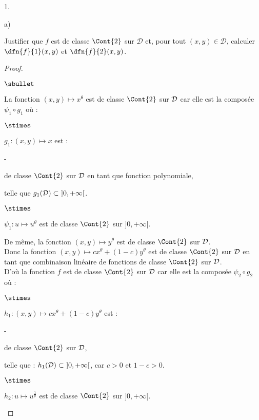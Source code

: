 \begin{noliste}{1.}
\begin{noliste}{a)}
  
  \item Justifier que $f$ est de classe $\Cont{2}$ sur $\mathcal{D}$ 
  et, pour tout $(x,y) \in \mathcal{D}$, calculer $\dfn{f}{1}(x,y)$ et 
  $\dfn{f}{2}(x,y)$.
  
  \begin{proof}~
   \begin{noliste}{$\sbullet$}
    \item La fonction $(x,y) \mapsto x^\theta$ est de classe $\Cont{2}$
    sur ${\cal D}$ car elle est la composée $\psi_1 \circ g_1$ où :
    \begin{noliste}{$\stimes$}
      \item $g_1 : (x,y) \mapsto x$ est :
    \end{noliste}
      \begin{liste}{-}
	\item de classe $\Cont{2}$ sur 
        ${\cal D}$ en tant que fonction polynomiale,
	\item telle que $g_1({\cal D}) \subset \ ]0,+\infty[$.
      \end{liste}
    \begin{noliste}{$\stimes$}
      \item $\psi_1 : u \mapsto u^\theta$ est de classe $\Cont{2}$ sur 
      $]0,+\infty[$.
    \end{noliste}
    De même, la fonction $(x,y) \mapsto y^\theta$ est de classe 
    $\Cont{2}$ sur ${\cal D}$.\\
    Donc la fonction $(x,y) \mapsto c x^\theta + (1-c) y^\theta$
    est de classe $\Cont{2}$ sur ${\cal D}$ en tant que 
    combinaison linéaire de fonctions de classe $\Cont{2}$ sur 
    ${\cal D}$.\\
    D'où la fonction $f$ est de classe $\Cont{2}$ sur ${\cal D}$
    car elle est la composée $\psi_2 \circ g_2$ où :
    \begin{noliste}{$\stimes$}
      \item $h_1 : (x,y) \mapsto c x^\theta + (1-c) y^\theta$ est :
    \end{noliste}
    \begin{liste}{-}
      \item de classe $\Cont{2}$ sur ${\cal D}$,
      \item telle que : $h_1({\cal D}) \subset \ ]0,+\infty[$, car 
      $c>0$ et $1-c>0$.
    \end{liste}
    \begin{noliste}{$\stimes$}
      \item $h_2 : u \mapsto u^{\frac{1}{\theta}}$ est de classe 
      $\Cont{2}$ sur $]0,+\infty[$.
    \end{noliste}
    

\end{noliste}
\end{proof}
\end{noliste}
\end{noliste}
